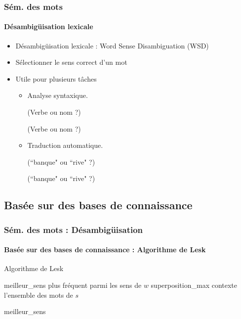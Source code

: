 \documentclass[xcolor=table]{beamer}
\begin{document}
\begin{frame}
\frametitle{Sém. des mots}
\framesubtitle{Désambigüisation lexicale}

\begin{itemize}
	\item Désambigüisation lexicale : Word Sense Disambiguation (WSD)
	\item Sélectionner le sens correct d'un mot 
	\item Utile pour plusieurs tâches 
	\begin{itemize}
		\item Analyse syntaxique. 
		
		 (Verbe ou nom ?)
		
		 (Verbe ou nom ?)
		
		\item Traduction automatique. 
		
		 (``banque" ou ``rive" ?)
		
		 (``banque" ou ``rive" ?)
	\end{itemize}
\end{itemize}

\end{frame}

\subsection{Basée sur des bases de connaissance}

\begin{frame}
\frametitle{Sém. des mots : Désambigüisation}
\framesubtitle{Basée sur des bases de connaissance : Algorithme de Lesk}

\vspace{-6pt}
\begin{block}{Algorithme de Lesk}
	\footnotesize\vspace{-3pt}
	\begin{algorithm}[H]
		
		meilleur\_sens \textleftarrow plus fréquent parmi les sens de $w$\;
		superposition\_max \;
		contexte \textleftarrow l'ensemble des mots de $s$\; 
		
		
		\Retour meilleur\_sens \;
		\vspace{-3pt}
	\end{algorithm}
\end{block}

\end{frame}
\end{document}
